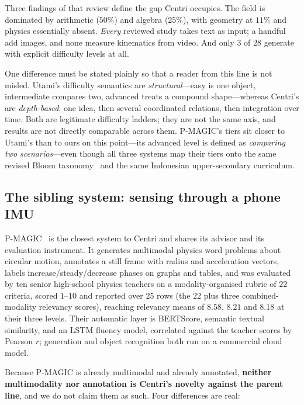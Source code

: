 \documentclass[conference]{IEEEtran}
\begin{document}
Three findings of that review define the gap Centri occupies. The field is
dominated by arithmetic ($50\%$) and algebra ($25\%$), with geometry at $11\%$
and physics essentially absent. \emph{Every} reviewed study takes text as
input; a handful add images, and none measure kinematics from video. And only
$3$ of $28$ generate with explicit difficulty levels at all.

One difference must be stated plainly so that a reader from this line is not
misled. Utami's difficulty semantics are \emph{structural}---easy is one
object, intermediate compares two, advanced treats a compound shape---whereas
Centri's are \emph{depth-based}: one idea, then several coordinated relations,
then integration over time. Both are legitimate difficulty ladders; they are
not the same axis, and results are not directly comparable across them.
P-MAGIC's tiers sit closer to Utami's than to ours on this point---its advanced
level is defined as \emph{comparing two scenarios}---even though all three
systems map their tiers onto the same revised Bloom taxonomy~\cite{bloom} and
the same Indonesian upper-secondary curriculum.

\subsection{The sibling system: sensing through a phone IMU}

P-MAGIC~\cite{pmagic} is the closest system to Centri and shares its advisor
and its evaluation instrument. It generates multimodal physics word problems
about circular motion, annotates a still frame with radius and acceleration
vectors, labels increase/steady/decrease phases on graphs and tables, and was
evaluated by ten senior high-school physics teachers on a modality-organised
rubric of $22$ criteria, scored $1$--$10$ and reported over $25$ rows (the $22$
plus three combined-modality relevancy scores), reaching relevancy means of
$8.58$, $8.21$ and $8.18$ at their three levels. Their automatic layer is
BERTScore, semantic textual similarity, and an LSTM fluency model, correlated
against the teacher scores by Pearson $r$; generation and object recognition
both run on a commercial cloud model.

Because P-MAGIC is already multimodal and already annotated, \textbf{neither
multimodality nor annotation is Centri's novelty against the parent line}, and
we do not claim them as such. Four differences are real:
\end{document}
